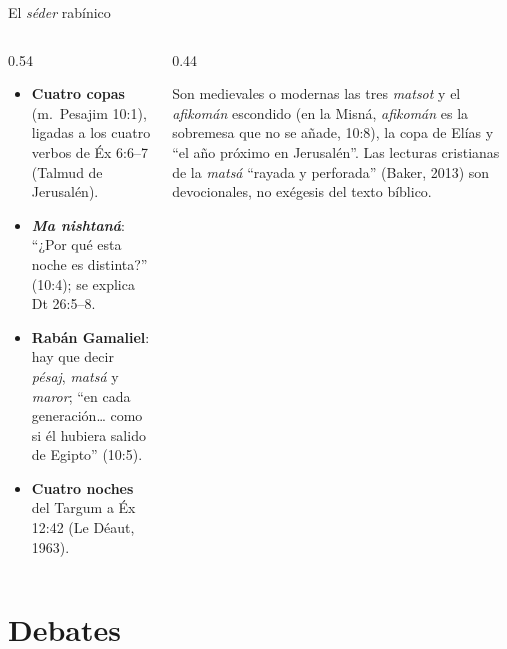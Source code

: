\begin{frame}{El \emph{séder} rabínico}
\begin{columns}[t,onlytextwidth]
\begin{column}{0.54\textwidth}\small
\begin{itemize}
\item \textbf{Cuatro copas} (m.~Pesajim 10:1), ligadas a los cuatro verbos de Éx 6:6--7 (Talmud de Jerusalén).
\item \textbf{\emph{Ma nishtaná}}: ``¿Por qué esta noche es distinta?'' (10:4); se explica Dt 26:5--8.
\item \textbf{Rabán Gamaliel}: hay que decir \emph{pésaj}, \emph{matsá} y \emph{maror}; ``en cada generación\ldots{} como si él hubiera salido de Egipto'' (10:5).
\item \textbf{Cuatro noches} del Targum a Éx 12:42 (Le Déaut, 1963).
\end{itemize}
\end{column}
\begin{column}{0.44\textwidth}
\begin{tcolorbox}[colback=mostaza!10,colframe=mostaza!85!tierraroja,boxrule=0.6pt,arc=2pt,title={Precisión: lo tardío},fonttitle=\bfseries\scriptsize,coltitle=caferojizo,colbacktitle=mostaza!30,fontupper=\scriptsize]
Son medievales o modernas las tres \emph{matsot} y el \emph{afikomán} escondido (en la Misná, \emph{afikomán} es la sobremesa que no se añade, 10:8), la copa de Elías y ``el año próximo en Jerusalén''. Las lecturas cristianas de la \emph{matsá} ``rayada y perforada'' (Baker, 2013) son devocionales, no exégesis del texto bíblico.
\end{tcolorbox}
\end{column}
\end{columns}
\end{frame}

\section{Debates}

